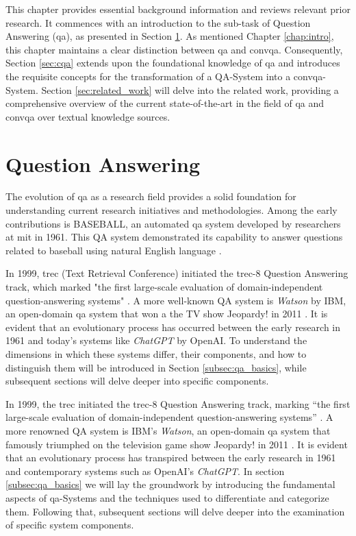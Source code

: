 This chapter provides essential background information and reviews relevant prior research. It commences with an introduction to the sub-task of Question Answering (\gls{qa}), as presented in Section \ref*{sec:qa}. As mentioned Chapter \ref{chap:intro}, this chapter maintains a clear distinction between \gls{qa} and \gls{convqa}. Consequently, Section \ref{sec:cqa} extends upon the foundational knowledge of \gls*{qa} and introduces the requisite concepts for the transformation of a QA-System into a \gls{convqa}-System. Section \ref{sec:related_work} will delve into the related work, providing a comprehensive overview of the current state-of-the-art in the field of \gls{qa} and \gls{convqa} over textual knowledge sources.

\section{Question Answering}
\label{sec:qa}

The evolution of \gls{qa} as a research field provides a solid foundation for understanding current research initiatives and methodologies. Among the early contributions is BASEBALL, an automated \gls{qa} system developed by researchers at \gls{mit} in 1961. This QA system demonstrated its capability to answer questions related to baseball using natural English language \cite{green_baseball_1961}.


In 1999, \gls{trec} (Text Retrieval Conference) initiated the \gls{trec}-8 Question Answering track, which marked "the first large-scale evaluation of domain-independent question-answering systems" \cite{voorhees_trec-8_1999}. A more well-known QA system is \textit{Watson} by IBM, an open-domain \gls{qa} system that won a the TV show Jeopardy! in 2011 \cite{ferrucci_introduction_2012}. It is evident that an evolutionary process has occurred between the early research in 1961 and today's systems like \textit{ChatGPT} by OpenAI. To understand the dimensions in which these systems differ, their components, and how to distinguish them will be introduced in Section \ref{subsec:qa_basics}, while subsequent sections will delve deeper into specific components.

In 1999, the \gls{trec} initiated the \gls{trec}-8 Question Answering track, marking \enquote{the first large-scale evaluation of domain-independent question-answering systems} \cite{voorhees_trec-8_1999}. A more renowned QA system is IBM's \textit{Watson}, an open-domain \gls{qa} system that famously triumphed on the television game show Jeopardy! in 2011 \cite{ferrucci_introduction_2012}. It is evident that an evolutionary process has transpired between the early research in 1961 and contemporary systems such as OpenAI's \textit{ChatGPT}. In section \ref{subsec:qa_basics} we will lay the groundwork by introducing the fundamental aspects of \gls{qa}-Systems and the techniques used to differentiate and categorize them. Following that, subsequent sections will delve deeper into the examination of specific system components.


